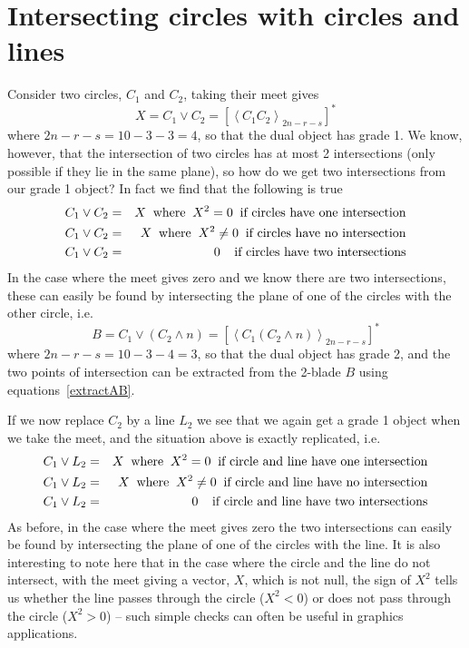 \section{Intersecting circles with circles and lines }

Consider two circles, $C_1$ and $C_2$, taking their meet
gives
%
\begin{equation}
X = C_1 \vee C_2 = \left[\left< C_1 C_2
\right>_{2n-r-s}\right]^*
\end{equation}
%
where $2n-r-s=10-3-3=4$, so that the dual object has
grade 1. We know, however, that the intersection of two
circles has at most 2 intersections (only possible if
they lie in the same plane), so how do we get two
intersections from our grade 1 object? In fact we find
that the following is true
%
\begin{eqnarray}
C_1 \vee C_2  &  =  &  X \;\;\mbox{where}\;\;
X^2=0\;\;\mbox{if circles have one intersection} \nonumber \\
C_1 \vee C_2  &  =  &  X \;\;\mbox{where}\;\;
X^2\ne 0\;\;\mbox{if circles have no intersection} \nonumber \\
C_1 \vee C_2  &  =  &  0 \;\; \;\;\mbox{if circles have
two intersections}
\end{eqnarray}
%
In the case where the meet gives zero and we know there
are two intersections, these can easily be found by
intersecting the plane of one of the circles with the
other circle, i.e.
%
\begin{equation}
B = C_1 \vee (C_2\wedge n) =  \left[\left< C_1 (C_2\wedge n)
\right>_{2n-r-s}\right]^*
\end{equation}
%
where $2n-r-s=10-3-4=3$, so that the dual object has
grade 2, and the two points of intersection can be
extracted from the 2-blade $B$ using
equations~\ref{extractAB}.

If we now replace $C_2$ by a line $L_2$ we see that we
again get a grade 1 object when we take the meet, and the
situation above is exactly replicated, i.e.
%
\begin{eqnarray}
C_1 \vee L_2  &  =  &  X \;\;\mbox{where}\;\;
X^2=0\;\;\mbox{if circle and line have one intersection} \nonumber \\
C_1 \vee L_2  &  =  &  X \;\;\mbox{where}\;\;
X^2\ne 0\;\;\mbox{if circle and line have no intersection} \nonumber \\
C_1 \vee L_2  &  =  &  0 \;\; \;\;\mbox{if circle and
line have two intersections}
\end{eqnarray}
%
As before, in the case where the meet gives zero the two
intersections can easily be found by intersecting the
plane of one of the circles with the line. It is also
interesting to note here that in the case where the
circle and the line do not intersect, with the meet
giving a vector, $X$, which is not null, the sign of
$X^2$ tells us whether the line passes through the circle
($X^2<0$) or does not pass through the circle ($X^2>0$)
-- such simple checks can often be useful in graphics
applications.


